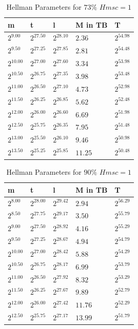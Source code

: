 \begin{table}[H]
  \centering
\begin{tabular}{lllll}
m & t & l & M in TB & T \\\hline
$2^{9.00}$ & $2^{27.50}$ & $2^{28.10}$ & $2.36$ & $2^{54.98}$ \\
$2^{9.50}$ & $2^{27.25}$ & $2^{27.85}$ & $2.81$ & $2^{54.48}$ \\
$2^{10.00}$ & $2^{27.00}$ & $2^{27.60}$ & $3.34$ & $2^{53.98}$ \\
$2^{10.50}$ & $2^{26.75}$ & $2^{27.35}$ & $3.98$ & $2^{53.48}$ \\
$2^{11.00}$ & $2^{26.50}$ & $2^{27.10}$ & $4.73$ & $2^{52.98}$ \\
$2^{11.50}$ & $2^{26.25}$ & $2^{26.85}$ & $5.62$ & $2^{52.48}$ \\
$2^{12.00}$ & $2^{26.00}$ & $2^{26.60}$ & $6.69$ & $2^{51.98}$ \\
$2^{12.50}$ & $2^{25.75}$ & $2^{26.35}$ & $7.95$ & $2^{51.48}$ \\
$2^{13.00}$ & $2^{25.50}$ & $2^{26.10}$ & $9.46$ & $2^{50.98}$ \\
$2^{13.50}$ & $2^{25.25}$ & $2^{25.85}$ & $11.25$ & $2^{50.48}$ \\
\end{tabular}
 \caption{Hellman Parameters for $73\%$ $Hmsc = 1$}
\end{table}
\begin{table}[H]
  \centering
\begin{tabular}{lllll}
m & t & l & M in TB & T \\\hline
$2^{8.00}$ & $2^{28.00}$ & $2^{29.42}$ & $2.94$ & $2^{56.29}$ \\
$2^{8.50}$ & $2^{27.75}$ & $2^{29.17}$ & $3.50$ & $2^{55.79}$ \\
$2^{9.00}$ & $2^{27.50}$ & $2^{28.92}$ & $4.16$ & $2^{55.29}$ \\
$2^{9.50}$ & $2^{27.25}$ & $2^{28.67}$ & $4.94$ & $2^{54.79}$ \\
$2^{10.00}$ & $2^{27.00}$ & $2^{28.42}$ & $5.88$ & $2^{54.29}$ \\
$2^{10.50}$ & $2^{26.75}$ & $2^{28.17}$ & $6.99$ & $2^{53.79}$ \\
$2^{11.00}$ & $2^{26.50}$ & $2^{27.92}$ & $8.32$ & $2^{53.29}$ \\
$2^{11.50}$ & $2^{26.25}$ & $2^{27.67}$ & $9.89$ & $2^{52.79}$ \\
$2^{12.00}$ & $2^{26.00}$ & $2^{27.42}$ & $11.76$ & $2^{52.29}$ \\
$2^{12.50}$ & $2^{25.75}$ & $2^{27.17}$ & $13.99$ & $2^{51.79}$ \\
\end{tabular}
  \caption{Hellman Parameters for $90\%$ $Hmsc = 1$}
\end{table}

